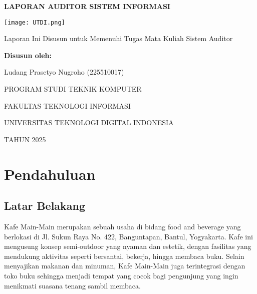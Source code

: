 \documentclass[12pt, a4paper]{report}
\begin{document}
\begin{titlepage}
    \centering
    
    {\fontsize{16}{18}\bfseries
    LAPORAN AUDITOR SISTEM INFORMASI\par
    }
    
    \vspace{1.5cm}
    
    \texttt{[image: UTDI.png]}
      
    \vspace{1.5cm}
    
    {\large
    Laporan Ini Disusun untuk Memenuhi Tugas Mata Kuliah Sistem Auditor\par
    }
    
    \vspace{3cm}
    
    {\bfseries
    Disusun oleh:\par
    Ludang Prasetyo Nugroho (225510017)\par
    }
    
    \vfill %
    
    {\large
    PROGRAM STUDI TEKNIK KOMPUTER \par
    FAKULTAS TEKNOLOGI INFORMASI \par
    UNIVERSITAS TEKNOLOGI DIGITAL INDONESIA \par
    TAHUN 2025 \par
    }
\end{titlepage}

\tableofcontents
\newpage

\onehalfspacing

\chapter{Pendahuluan}
\label{bab:pendahuluan}

\section{Latar Belakang}

Kafe Main-Main merupakan sebuah usaha di bidang food and beverage yang berlokasi di Jl. Sukun Raya No. 422, Banguntapan, Bantul, Yogyakarta. Kafe ini mengusung konsep semi-outdoor yang nyaman dan estetik, dengan fasilitas yang mendukung aktivitas seperti bersantai, bekerja, hingga membaca buku. Selain menyajikan makanan dan minuman, Kafe Main-Main juga terintegrasi dengan toko buku sehingga menjadi tempat yang cocok bagi pengunjung yang ingin menikmati suasana tenang sambil membaca.
\end{document}
